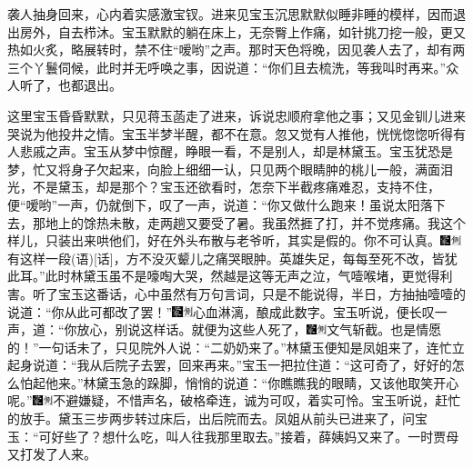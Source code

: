 袭人抽身回来，心内着实感激宝钗。进来见宝玉沉思默默似睡非睡的模样，因而退出房外，自去栉沐。宝玉默默的躺在床上，无奈臀上作痛，如针挑刀挖一般，更又热如火炙，略展转时，禁不住“嗳哟”之声。那时天色将晚，因见袭人去了，却有两三个丫鬟伺候，此时并无呼唤之事，因说道：“你们且去梳洗，等我叫时再来。”众人听了，也都退出。

这里宝玉昏昏默默，只见蒋玉菡走了进来，诉说忠顺府拿他之事；又见金钏儿进来哭说为他投井之情。宝玉半梦半醒，都不在意。忽又觉有人推他，恍恍惚惚听得有人悲戚之声。宝玉从梦中惊醒，睁眼一看，不是别人，却是林黛玉。宝玉犹恐是梦，忙又将身子欠起来，向脸上细细一认，只见两个眼睛肿的桃儿一般，满面泪光，不是黛玉，却是那个？宝玉还欲看时，怎奈下半截疼痛难忍，支持不住，便“嗳哟”一声，仍就倒下，叹了一声，说道：“你又做什么跑来！虽说太阳落下去，那地上的馀热未散，走两趟又要受了暑。我虽然捱了打，并不觉疼痛。我这个样儿，只装出来哄他们，好在外头布散与老爷听，其实是假的。你不可认真。{\includegraphics[width=3mm]{../Images/00006}\includegraphics[width=3mm]{../Images/00011}\footnotesize \kaishu 有这样一段{(语)}{[}话{]}，方不没灭颦儿之痛哭眼肿。英雄失足，每每至死不改，皆犹此耳。}”此时林黛玉虽不是嚎啕大哭，然越是这等无声之泣，气噎喉堵，更觉得利害。听了宝玉这番话，心中虽然有万句言词，只是不能说得，半日，方抽抽噎噎的说道：“你从此可都改了罢！”{\includegraphics[width=3mm]{../Images/00006}\includegraphics[width=3mm]{../Images/00011}\footnotesize \kaishu 心血淋漓，酿成此数字。}宝玉听说，便长叹一声，道：“你放心，别说这样话。就便为这些人死了，{\includegraphics[width=3mm]{../Images/00006}\includegraphics[width=3mm]{../Images/00011}\footnotesize \kaishu 文气斩截。}也是情愿的！”一句话未了，只见院外人说：“二奶奶来了。”林黛玉便知是凤姐来了，连忙立起身说道：“我从后院子去罢，回来再来。”宝玉一把拉住道：“这可奇了，好好的怎么怕起他来。”林黛玉急的跺脚，悄悄的说道：“你瞧瞧我的眼睛，又该他取笑开心呢。”{\includegraphics[width=3mm]{../Images/00006}\includegraphics[width=3mm]{../Images/00011}\footnotesize \kaishu 不避嫌疑，不惜声名，破格牵连，诚为可叹，着实可怜。}宝玉听说，赶忙的放手。黛玉三步两步转过床后，出后院而去。凤姐从前头已进来了，问宝玉：“可好些了？想什么吃，叫人往我那里取去。”接着，薛姨妈又来了。一时贾母又打发了人来。

